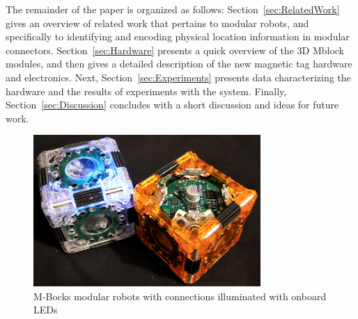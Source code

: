 The remainder of the paper is organized as follows:
Section~\ref{sec:RelatedWork} gives an overview of related
work that pertains to modular robots, and specifically to identifying and encoding physical location information in modular connectors.
Section~\ref{sec:Hardware} presents a quick overview of the 3D Mblock modules, and then gives a detailed description of the new magnetic tag hardware and electronics.
Next, Section~\ref{sec:Experiments}
presents data characterizing the hardware and the results of
experiments with the system.
Finally, Section~\ref{sec:Discussion}
concludes with a short discussion and ideas for future work.

\begin{figure}[htb]

  \centering
  \includegraphics[width=3.4in]{Figures/cover.png}

  \caption{M-Bocks modular robots with connections illuminated with onboard LEDs}

  \label{fig:cover}
\end{figure}
